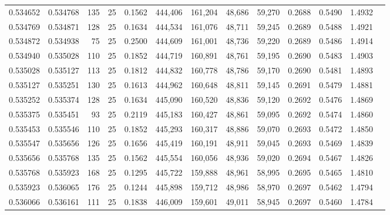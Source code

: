 \begin{tabular}{rrrrrrrrrrrrr}
0.534652 & 0.534768 &   135 &  25 &                                     0.1562 & 444,406 & 161,204 &  48,686 &  59,270 & 0.2688 & 0.5490 & 1.4932 \\
0.534769 & 0.534871 &   128 &  25 &                                     0.1634 & 444,534 & 161,076 &  48,711 &  59,245 & 0.2689 & 0.5488 & 1.4921 \\
0.534872 & 0.534938 &    75 &  25 &                                     0.2500 & 444,609 & 161,001 &  48,736 &  59,220 & 0.2689 & 0.5486 & 1.4914 \\
0.534940 & 0.535028 &   110 &  25 &                                     0.1852 & 444,719 & 160,891 &  48,761 &  59,195 & 0.2690 & 0.5483 & 1.4903 \\
0.535028 & 0.535127 &   113 &  25 &                                     0.1812 & 444,832 & 160,778 &  48,786 &  59,170 & 0.2690 & 0.5481 & 1.4893 \\
0.535127 & 0.535251 &   130 &  25 &                                     0.1613 & 444,962 & 160,648 &  48,811 &  59,145 & 0.2691 & 0.5479 & 1.4881 \\
0.535252 & 0.535374 &   128 &  25 &                                     0.1634 & 445,090 & 160,520 &  48,836 &  59,120 & 0.2692 & 0.5476 & 1.4869 \\
0.535375 & 0.535451 &    93 &  25 &                                     0.2119 & 445,183 & 160,427 &  48,861 &  59,095 & 0.2692 & 0.5474 & 1.4860 \\
0.535453 & 0.535546 &   110 &  25 &                                     0.1852 & 445,293 & 160,317 &  48,886 &  59,070 & 0.2693 & 0.5472 & 1.4850 \\
0.535547 & 0.535656 &   126 &  25 &                                     0.1656 & 445,419 & 160,191 &  48,911 &  59,045 & 0.2693 & 0.5469 & 1.4839 \\
0.535656 & 0.535768 &   135 &  25 &                                     0.1562 & 445,554 & 160,056 &  48,936 &  59,020 & 0.2694 & 0.5467 & 1.4826 \\
0.535768 & 0.535923 &   168 &  25 &                                     0.1295 & 445,722 & 159,888 &  48,961 &  58,995 & 0.2695 & 0.5465 & 1.4810 \\
0.535923 & 0.536065 &   176 &  25 &                                     0.1244 & 445,898 & 159,712 &  48,986 &  58,970 & 0.2697 & 0.5462 & 1.4794 \\
0.536066 & 0.536161 &   111 &  25 &                                     0.1838 & 446,009 & 159,601 &  49,011 &  58,945 & 0.2697 & 0.5460 & 1.4784 \\

\end{tabular}
